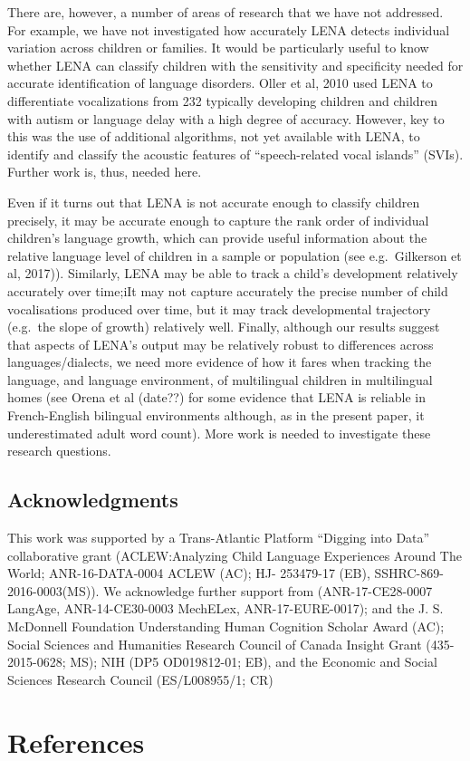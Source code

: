 \documentclass[english,floatsintext,man]{apa6}
\begin{document}
There are, however, a number of areas of research that we have not
addressed. For example, we have not investigated how accurately LENA
detects individual variation across children or families. It would be
particularly useful to know whether LENA can classify children with the
sensitivity and specificity needed for accurate identification of
language disorders. Oller et al, 2010 used LENA to differentiate
vocalizations from 232 typically developing children and children with
autism or language delay with a high degree of accuracy. However, key to
this was the use of additional algorithms, not yet available with LENA,
to identify and classify the acoustic features of
\enquote{speech-related vocal islands} (SVIs). Further work is, thus,
needed here.

Even if it turns out that LENA is not accurate enough to classify
children precisely, it may be accurate enough to capture the rank order
of individual children's language growth, which can provide useful
information about the relative language level of children in a sample or
population (see e.g.~Gilkerson et al, 2017)). Similarly, LENA may be
able to track a child's development relatively accurately over time;iIt
may not capture accurately the precise number of child vocalisations
produced over time, but it may track developmental trajectory (e.g.~the
slope of growth) relatively well. Finally, although our results suggest
that aspects of LENA's output may be relatively robust to differences
across languages/dialects, we need more evidence of how it fares when
tracking the language, and language environment, of multilingual
children in multilingual homes (see Orena et al (date??) for some
evidence that LENA is reliable in French-English bilingual environments
although, as in the present paper, it underestimated adult word count).
More work is needed to investigate these research questions.

\subsection{Acknowledgments}\label{acknowledgments}

This work was supported by a Trans-Atlantic Platform \enquote{Digging
into Data} collaborative grant (ACLEW:Analyzing Child Language
Experiences Around The World; ANR-16-DATA-0004 ACLEW (AC); HJ- 253479-17
(EB), SSHRC-869-2016-0003(MS)). We acknowledge further support from
(ANR-17-CE28-0007 LangAge, ANR-14-CE30-0003 MechELex, ANR-17-EURE-0017);
and the J. S. McDonnell Foundation Understanding Human Cognition Scholar
Award (AC); Social Sciences and Humanities Research Council of Canada
Insight Grant (435-2015-0628; MS); NIH (DP5 OD019812-01; EB), and the
Economic and Social Sciences Research Council (ES/L008955/1; CR)

\newpage

\section{References}\label{references}

\setlength{\parindent}{-0.5in} \setlength{\leftskip}{0.5in}
\end{document}
